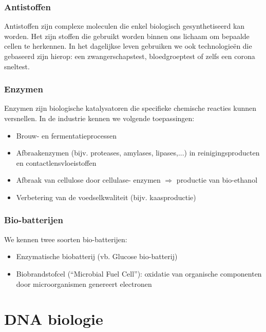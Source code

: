 \documentclass[a4paper,kul]{kulakarticle} %
\begin{document}
\subsubsection{Antistoffen}
Antistoffen zijn complexe moleculen die enkel biologisch gesynthetiseerd kan worden. Het zijn stoffen die gebruikt worden binnen ons lichaam om bepaalde cellen te herkennen. In het dagelijkse leven gebruiken we ook technologieën die gebaseerd zijn hierop: een zwangerschapstest, bloedgroeptest of zelfs een corona sneltest. 
\subsubsection{Enzymen}
Enzymen zijn biologische katalysatoren die specifieke chemische reacties kunnen versnellen. In de industrie kennen we volgende toepassingen:
\begin{itemize}
	\item Brouw- en fermentatieprocessen
	\item Afbraakenzymen (bijv. proteases, amylases,
	lipases,...) in reinigingsproducten en contactlensvloeistoffen
	\item Afbraak van cellulose door cellulase-
	enzymen $\Rightarrow$ productie van bio-ethanol
	\item Verbetering van de voedselkwaliteit (bijv.
	kaasproductie)
\end{itemize}
\subsubsection{Bio-batterijen}
We kennen twee soorten bio-batterijen:
\begin{itemize}
	\item Enzymatische biobatterij (vb. Glucose bio-batterij)
	\item Biobrandstofcel (“Microbial Fuel Cell”): oxidatie van organische
	componenten door microorganismen genereert electronen
\end{itemize}
\newpage
\section{DNA biologie}
\label{sec:dnabiologie}
\end{document}

